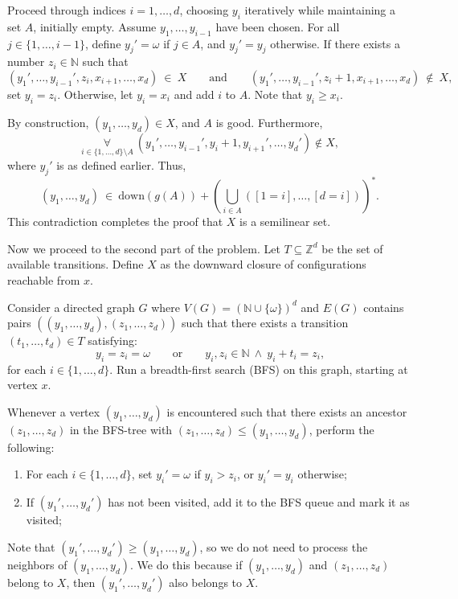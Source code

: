 \documentclass[12pt]{article}
\begin{document}
	\medskip
	
	Proceed through indices \(i = 1, \ldots, d\), choosing \(y_{i}\) iteratively
	while maintaining a set \(A\), initially empty. Assume \(y_{1}, \ldots,
	y_{i - 1}\) have been chosen. For all \(j \in \{1, \ldots, i - 1\}\), define
	\(y_{j}' = \omega\) if \(j \in A\), and \(y_{j}' = y_{j}\) otherwise. If
	there exists a number \(z_{i} \in \mathbb{N}\) such that
	\[ (y_{1}', \ldots, y_{i - 1}', z_{i}, x_{i + 1}, \ldots, x_{d}) \ \in \ X
	\qquad \text{and} \qquad (y_{1}', \ldots, y_{i - 1}', z_{i} + 1, x_{i + 1},
	\ldots, x_{d}) \ \notin \ X \text{,} \]
	set \(y_{i} = z_{i}\). Otherwise, let \(y_{i} = x_{i}\) and add \(i\) to
	\(A\). Note that \(y_{i} \geqslant x_{i}\).
	
	\medskip
	
	By construction, \((y_{1}, \ldots, y_{d}) \in X\), and \(A\) is good.
	Furthermore,
	\[ \underset{i \in \{1, \ldots, d\} \setminus A} {\forall} \ (y_{1}',
	\ldots, y_{i - 1}', y_{i} + 1, y_{i + 1}', \ldots, y_{d}') \notin X
	\text{,} \]
	where \(y_{j}'\) is as defined earlier. Thus,
	\[ (y_{1}, \ldots, y_{d}) \ \in \ \text{down}(g(A)) + \left(
	\bigcup_{i \in A} ([1 = i], \ldots, [d = i]) \right)^{\ast} \text{.} \]
	This contradiction completes the proof that \(X\) is a semilinear set.
	
	\medskip
	
	Now we proceed to the second part of the problem. Let \(T \subseteq
	\mathbb{Z}^{d}\) be the set of available transitions. Define \(X\) as the
	downward closure of configurations reachable from \(x\).
	
	\medskip
	
	Consider a directed graph \(G\) where \(V(G) = (\mathbb{N} \cup
	\{\omega\})^{d}\) and \(E(G)\) contains pairs \(((y_{1}, \ldots, y_{d}),
	\allowbreak (z_{1}, \ldots, z_{d}))\) such that there exists a transition
	\((t_{1}, \ldots, t_{d}) \in T\) satisfying:
	\[ y_{i} = z_{i} = \omega \qquad \text{or} \qquad y_{i}, z_{i} \in
	\mathbb{N} \ \wedge \ y_{i} + t_{i} = z_{i} \text{,} \]
	for each \(i \in \{1, \ldots, d\}\). Run a breadth-first search (BFS) on
	this graph, starting at vertex \(x\).
	
	\medskip
	
	Whenever a vertex \((y_{1}, \ldots, y_{d})\) is encountered such that there
	exists an ancestor \((z_{1}, \ldots, z_{d})\) in the BFS-tree with \((z_{1},
	\ldots, z_{d}) \leqslant (y_{1}, \ldots, y_{d})\), perform the following:
	\begin{enumerate}
		\item For each \(i \in \{1, \ldots, d\}\), set \(y_{i}' = \omega\) if
		\(y_{i} > z_{i}\), or \(y_{i}' = y_{i}\) otherwise;
		\item If \((y_{1}', \ldots, y_{d}')\) has not been visited, add it to
		      the BFS queue and mark it as visited;
	\end{enumerate}
	Note that \((y_{1}', \ldots, y_{d}') \geqslant (y_{1}, \ldots, y_{d})\), so
	we do not need to process the neighbors of \((y_{1}, \ldots, y_{d})\). We do
	this because if \((y_{1}, \ldots, y_{d})\) and \((z_{1}, \ldots, z_{d})\)
	belong to \(X\), then \((y_{1}', \ldots, y_{d}')\) also belongs to \(X\).
	
\end{document}
